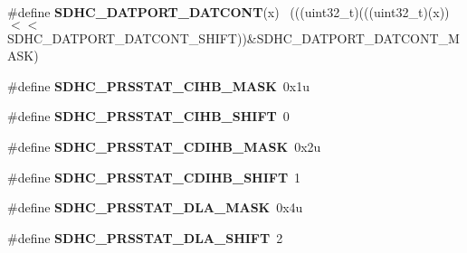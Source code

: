 \begin{DoxyCompactItemize}
\item 
\hypertarget{group___s_d_h_c___register___masks_gaddc5546b007e2655071b0e968a516c90}{}\#define {\bfseries S\+D\+H\+C\+\_\+\+D\+A\+T\+P\+O\+R\+T\+\_\+\+D\+A\+T\+C\+O\+N\+T}(x)                                ~(((uint32\+\_\+t)(((uint32\+\_\+t)(x))$<$$<$S\+D\+H\+C\+\_\+\+D\+A\+T\+P\+O\+R\+T\+\_\+\+D\+A\+T\+C\+O\+N\+T\+\_\+\+S\+H\+I\+F\+T))\&S\+D\+H\+C\+\_\+\+D\+A\+T\+P\+O\+R\+T\+\_\+\+D\+A\+T\+C\+O\+N\+T\+\_\+\+M\+A\+S\+K)\label{group___s_d_h_c___register___masks_gaddc5546b007e2655071b0e968a516c90}

\item 
\hypertarget{group___s_d_h_c___register___masks_gaaba7df21329c057fa8906bcdffefb948}{}\#define {\bfseries S\+D\+H\+C\+\_\+\+P\+R\+S\+S\+T\+A\+T\+\_\+\+C\+I\+H\+B\+\_\+\+M\+A\+S\+K}~0x1u\label{group___s_d_h_c___register___masks_gaaba7df21329c057fa8906bcdffefb948}

\item 
\hypertarget{group___s_d_h_c___register___masks_ga104678507322e6937284cec9aabbe2ff}{}\#define {\bfseries S\+D\+H\+C\+\_\+\+P\+R\+S\+S\+T\+A\+T\+\_\+\+C\+I\+H\+B\+\_\+\+S\+H\+I\+F\+T}~0\label{group___s_d_h_c___register___masks_ga104678507322e6937284cec9aabbe2ff}

\item 
\hypertarget{group___s_d_h_c___register___masks_ga41cd86790ec73a0f81fe4910f8e6b379}{}\#define {\bfseries S\+D\+H\+C\+\_\+\+P\+R\+S\+S\+T\+A\+T\+\_\+\+C\+D\+I\+H\+B\+\_\+\+M\+A\+S\+K}~0x2u\label{group___s_d_h_c___register___masks_ga41cd86790ec73a0f81fe4910f8e6b379}

\item 
\hypertarget{group___s_d_h_c___register___masks_gaebffc8f5a96e2405094e614d8ab72bc2}{}\#define {\bfseries S\+D\+H\+C\+\_\+\+P\+R\+S\+S\+T\+A\+T\+\_\+\+C\+D\+I\+H\+B\+\_\+\+S\+H\+I\+F\+T}~1\label{group___s_d_h_c___register___masks_gaebffc8f5a96e2405094e614d8ab72bc2}

\item 
\hypertarget{group___s_d_h_c___register___masks_ga609f9258fa078236470445ebfcd2e9ac}{}\#define {\bfseries S\+D\+H\+C\+\_\+\+P\+R\+S\+S\+T\+A\+T\+\_\+\+D\+L\+A\+\_\+\+M\+A\+S\+K}~0x4u\label{group___s_d_h_c___register___masks_ga609f9258fa078236470445ebfcd2e9ac}

\item 
\hypertarget{group___s_d_h_c___register___masks_gaad30094ca6309410952688acf6ed5f07}{}\#define {\bfseries S\+D\+H\+C\+\_\+\+P\+R\+S\+S\+T\+A\+T\+\_\+\+D\+L\+A\+\_\+\+S\+H\+I\+F\+T}~2\label{group___s_d_h_c___register___masks_gaad30094ca6309410952688acf6ed5f07}


\end{DoxyCompactItemize}
